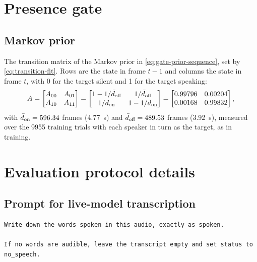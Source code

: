 \section{Presence gate}
\label{sec:appendix-gate}

\subsection{Markov prior}
\label{app:gate-prior}
The transition matrix of the Markov prior in \eqref{eq:gate-prior-sequence}, set by \eqref{eq:transition-fit}. Rows are the state in frame $t-1$ and columns the state in frame $t$, with 0 for the target silent and 1 for the target speaking:
\begin{equation}
A =
\begin{bmatrix} A_{00} & A_{01} \\ A_{10} & A_{11} \end{bmatrix}
=
\begin{bmatrix} 1 - 1/\bar{d}_\textup{off} & 1/\bar{d}_\textup{off} \\ 1/\bar{d}_\textup{on} & 1 - 1/\bar{d}_\textup{on} \end{bmatrix}
=
\begin{bmatrix} 0.99796 & 0.00204 \\ 0.00168 & 0.99832 \end{bmatrix},
\label{eq:transition-matrix}
\end{equation}
with $\bar{d}_\textup{on} = 596.34$ frames (\SI{4.77}{\second}) and $\bar{d}_\textup{off} = 489.53$ frames (\SI{3.92}{\second}), measured over the \num{9955} training trials with each speaker in turn as the target, as in training. 

\section{Evaluation protocol details}
\label{app:protocol}

\subsection{Prompt for live-model transcription}
\label{app:prompt}

{\footnotesize
\begin{verbatim}
Write down the words spoken in this audio, exactly as spoken.

If no words are audible, leave the transcript empty and set status to no_speech.
\end{verbatim}
}


